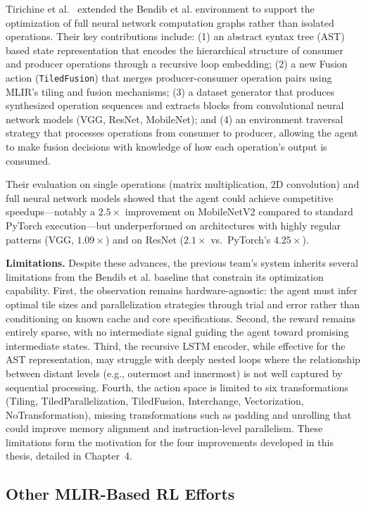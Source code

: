 Tirichine et al.~\cite{tirichine2025reinforcement} extended the Bendib et al. environment to support the optimization of full neural network computation graphs rather than isolated operations. Their key contributions include: (1) an abstract syntax tree (AST) based state representation that encodes the hierarchical structure of consumer and producer operations through a recursive loop embedding; (2) a new Fusion action (\texttt{TiledFusion}) that merges producer-consumer operation pairs using MLIR's tiling and fusion mechanisms; (3) a dataset generator that produces synthesized operation sequences and extracts blocks from convolutional neural network models (VGG, ResNet, MobileNet); and (4) an environment traversal strategy that processes operations from consumer to producer, allowing the agent to make fusion decisions with knowledge of how each operation's output is consumed.

Their evaluation on single operations (matrix multiplication, 2D convolution) and full neural network models showed that the agent could achieve competitive speedups—notably a $2.5\times$ improvement on MobileNetV2 compared to standard PyTorch execution—but underperformed on architectures with highly regular patterns (VGG, $1.09\times$) and on ResNet ($2.1\times$ vs.\ PyTorch's $4.25\times$).

\textbf{Limitations.} Despite these advances, the previous team's system inherits several limitations from the Bendib et al. baseline that constrain its optimization capability. First, the observation remains hardware-agnostic: the agent must infer optimal tile sizes and parallelization strategies through trial and error rather than conditioning on known cache and core specifications. Second, the reward remains entirely sparse, with no intermediate signal guiding the agent toward promising intermediate states. Third, the recursive LSTM encoder, while effective for the AST representation, may struggle with deeply nested loops where the relationship between distant levels (e.g., outermost and innermost) is not well captured by sequential processing. Fourth, the action space is limited to six transformations (Tiling, TiledParallelization, TiledFusion, Interchange, Vectorization, NoTransformation), missing transformations such as padding and unrolling that could improve memory alignment and instruction-level parallelism. These limitations form the motivation for the four improvements developed in this thesis, detailed in Chapter~4.

\subsection{Other MLIR-Based RL Efforts}


